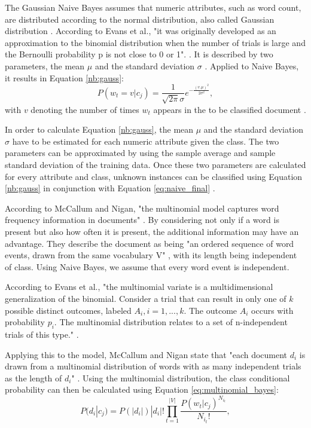         The Gaussian Naive Bayes assumes that numeric attributes, such as word count, are distributed according to the normal distribution, also called Gaussian distribution \cite{nb_gauss}. According to Evans et al., "it was originally developed as an approximation to the binomial distribution when the number of trials is large and the Bernoulli probability p is not close to 0 or 1". \cite[p.~143]{evans2011statistical}. It is described by two parameters, the mean $\mu$ and the standard deviation $\sigma$ \cite{evans2011statistical}. Applied to Naive Bayes, it results in Equation \eqref{nb:gauss}:
        \begin{equation}
        \label{nb:gauss}
            P(w_t = v|c_j) = \frac{1}{\sqrt{2\pi}\sigma}e^{-\frac{(v.\mu)^2}{2\sigma^2}},
        \end{equation}
        with $v$ denoting the number of times $w_t$ appears in the to be classified document \cite{nb_gauss}.
        
        In order to calculate Equation \eqref{nb:gauss}, the mean $\mu$ and the standard deviation $\sigma$ have to be estimated for each numeric attribute given the class. The two parameters can be approximated by using the sample average and sample standard deviation of the training data. Once these two parameters are calculated for every attribute and class, unknown instances can be classified using Equation \eqref{nb:gauss} in conjunction with Equation \eqref{eq:naive_final} \cite{nb_gauss}.
        
        According to McCallum and Nigan, "the multinomial model captures word frequency information in documents" \cite[p.~3]{Mccallum1998}. By considering not only if a word is present but also how often it is present, the additional information may have an advantage. They describe the document as being "an ordered sequence of word events, drawn from the same vocabulary V" \cite[p.~3]{Mccallum1998}, with its length being independent of class. Using Naive Bayes, we assume that every word event is independent.
        
        According to Evans et al., "the multinomial variate is a multidimensional generalization of the binomial. Consider a trial that can result in only one of $k$ possible distinct outcomes, labeled $A_i, i = 1,...,k$. The outcome $A_i$ occurs with probability $p_i$. The multinomial distribution relates to a set of n-independent trials of this type." \cite[p.~135]{evans2011statistical}.
        
        Applying this to the model, McCallum and Nigan state that "each document $d_i$ is drawn from a multinomial distribution of words with as many independent trials as the length of $d_i$" \cite[p.~3]{Mccallum1998}. Using the multinomial distribution, the class conditional probability can then be calculated using Equation \eqref{eq:multinomial_bayes}:
        \begin{equation}
            \label{eq:multinomial_bayes}
                P(d_i|c_j) = P(|d_i|)|d_i|!\prod_{t=1}^{|V|}\frac{P(w_t|c_j)^{N_{i_t}}}{N_{i_t}!},
        \end{equation}
        
